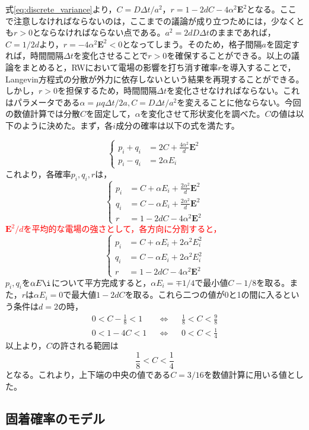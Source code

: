 \documentclass[autodetect-engine,dvi=dvipdfmx,a4paper,ja=standard,oneside,openany,11pt,draft]{bxjsbook}
\begin{document}
式\ref{eq:discrete_variance}より，$C=D\Delta t/a^2$，$r=1-2dC-4\alpha^2\bm{E}^2$となる。ここで注意しなければならないのは，ここまでの議論が成り立つためには，少なくとも$r>0$とならなければならない点である。$a^2=2dD\Delta t$のままであれば，$C=1/2d$より，$r=-4\alpha^2\bm{E}^2<0$となってしまう。そのため，格子間隔$a$を固定すれば，時間間隔$\Delta t$を変化させることで$r>0$を確保することができる。以上の議論をまとめると，RWにおいて電場の影響を打ち消す確率$r$を導入することで，Langevin方程式の分散が外力に依存しないという結果を再現することができる。しかし，$r>0$を担保するため，時間間隔$\Delta t$を変化させなければならない。これはパラメータである$\alpha=\mu q\Delta t/2a,C=D\Delta t/a^2$を変えることに他ならない。今回の数値計算では分散$C$を固定して，$\alpha$を変化させて形状変化を調べた。$C$の値は以下のように決めた。まず，各$i$成分の確率は以下の式を満たす。

\begin{equation}
  \left\{
  \begin{aligned}
    p_i+q_i & =2C+\frac{4\alpha^2}{d}\bm{E}^2 \\
    p_i-q_i & =2\alpha E_i
  \end{aligned}
  \right.
  \label{eq:prob}
\end{equation}
これより，各確率$p_i,q_i,r$は，
\begin{equation}
  \left\{
  \begin{aligned}
    p_i & =C+\alpha E_i+\frac{2\alpha^2}{d}\bm{E}^2 \\
    q_i & =C-\alpha E_i+\frac{2\alpha^2}{d}\bm{E}^2 \\
    r   & =1-2dC-4\alpha^2\bm{E}^2
  \end{aligned}
  \right.
  \label{eq:prob2}
\end{equation}
\textcolor{red}{$\bm{E}^2/d$を平均的な電場の強さとして，各方向に分割すると，}
\begin{equation}
  \left\{
  \begin{aligned}
    p_i & =C+\alpha E_i+2\alpha^2 E_i^2 \\
    q_i & =C-\alpha E_i+2\alpha^2 E_i^2 \\
    r   & =1-2dC-4\alpha^2\bm{E}^2
  \end{aligned}
  \right.
  \label{eq:prob3}
\end{equation}
$p_i,q_i$を$\alpha E\i$について平方完成すると，$\alpha E_i=\mp1/4$で最小値$C-1/8$を取る。また，$r$は$\alpha E_i=0$で最大値$1-2dC$を取る。これら二つの値が0と1の間に入るという条件は$d=2$の時，
\begin{align}
  0<C-\frac{1}{8}<1 &  & \Leftrightarrow &  & \frac{1}{8}<C<\frac{9}{8} \\
  0<1-4C<1          &  & \Leftrightarrow &  & 0<C<\frac{1}{4}
  \label{eq:condition}
\end{align}
以上より，$C$の許される範囲は
\begin{equation}
  \frac{1}{8}<C<\frac{1}{4}
  \label{eq:condition2}
\end{equation}
となる。これより，上下端の中央の値である$C=3/16$を数値計算に用いる値とした。
\subsection{固着確率のモデル}
\ifdraft{
  
  
}{}
\end{document}

